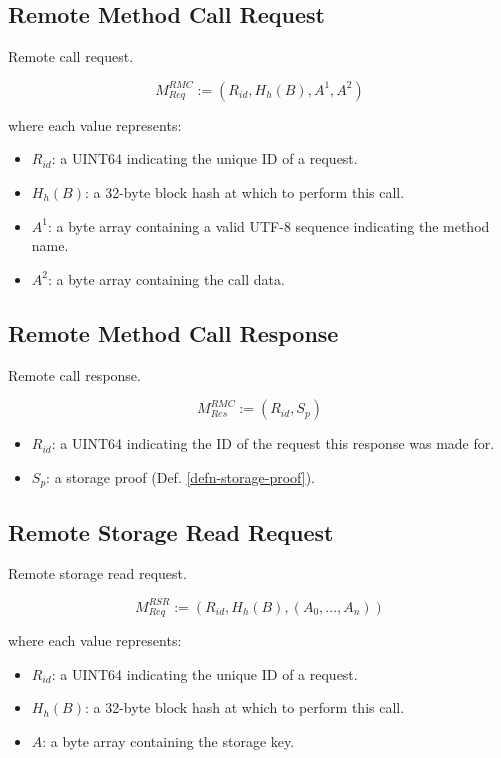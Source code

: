 \documentclass{book}
\begin{document}
\subsection{Remote Method Call Request}

Remote call request.

\[
    M^{RMC}_{Req} := (R_{id}, H_h(B), A^1, A^2)
\]

where each value represents:

\begin{itemize}
    \item $R_{id}$: a UINT64 indicating the unique ID of a request.
    \item $H_h(B)$: a 32-byte block hash at which to perform this call.
    \item $A^1$: a byte array containing a valid UTF-8 sequence indicating the
    method name.
    \item $A^2$: a byte array containing the call data.
\end{itemize}

\subsection{Remote Method Call Response}

Remote call response.

\[
    M^{RMC}_{Res} := (R_{id}, S_p)
\]

\begin{itemize}
    \item $R_{id}$: a UINT64 indicating the ID of the request this response was
    made for.
    \item $S_p$: a storage proof (Def. \ref{defn-storage-proof}).
\end{itemize}

\subsection{Remote Storage Read Request}

Remote storage read request.

\[
    M^{RSR}_{Req} := (R_{id}, H_h(B), (A_0, ..., A_n))
\]

where each value represents:

\begin{itemize}
    \item $R_{id}$: a UINT64 indicating the unique ID of a request.
    \item $H_h(B)$: a 32-byte block hash at which to perform this call.
    \item $A$: a byte array containing the storage key.
\end{itemize}
\end{document}
